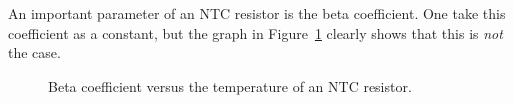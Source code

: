 \documentclass[a4paper]{article}
\begin{document}
An important parameter of an NTC resistor is the beta coefficient. One take this coefficient as a constant, but the graph in Figure~\ref{fig3} clearly shows that this is \emph{not} the case.

\begin{figure}[!ht]
\caption{Beta coefficient versus the temperature of an NTC resistor.}
\label{fig3}
\end{figure}
\end{document}
